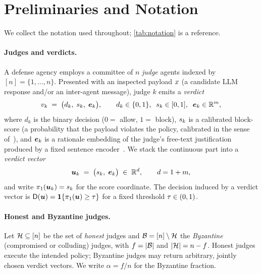 \section{Preliminaries and Notation}
\label{sec:prelim}

We collect the notation used throughout; \cref{tab:notation} is a reference.

\paragraph{Judges and verdicts.}
A defense agency employs a committee of $n$ \emph{judge} agents indexed by
$[n]=\{1,\dots,n\}$. Presented with an inspected payload $x$ (a candidate LLM
response and/or an inter-agent message), judge $k$ emits a \emph{verdict}
\begin{equation}
  v_k \;=\; \bigl(d_k,\; s_k,\; \bm{e}_k\bigr),
  \qquad d_k\in\{0,1\},\;\; s_k\in[0,1],\;\; \bm{e}_k\in\mathbb{R}^{m},
  \label{eq:verdict}
\end{equation}
where $d_k$ is the binary decision ($0=$ allow, $1=$ block), $s_k$ is a
calibrated block-score (a probability that the payload violates the policy, calibrated
in the sense of~\cite{guo2017calibration}), and $\bm{e}_k$ is a rationale embedding of the
judge's free-text justification produced by a fixed sentence
encoder~\cite{reimers2019sentencebert,gao2021simcse}. We stack the continuous part into a
\emph{verdict vector}
\begin{equation}
  \bm{u}_k \;=\; \bigl(s_k,\; \bm{e}_k\bigr)\;\in\;\mathbb{R}^{d},\qquad d = 1+m,
  \label{eq:verdictvec}
\end{equation}
and write $\pi_1(\bm{u}_k)=s_k$ for the score coordinate. The decision induced by a
verdict vector is $\mathsf{D}(\bm{u})=\mathbf{1}\{\pi_1(\bm{u})\ge \tau\}$ for a fixed
threshold $\tau\in(0,1)$.

\paragraph{Honest and Byzantine judges.}
Let $\mathcal{H}\subseteq[n]$ be the set of \emph{honest} judges and
$\mathcal{B}=[n]\setminus\mathcal{H}$ the \emph{Byzantine} (compromised or colluding) judges, with
$f=|\mathcal{B}|$ and $|\mathcal{H}|=n-f$. Honest judges execute the intended policy; Byzantine
judges may return arbitrary, jointly chosen verdict vectors. We write $\alpha=f/n$ for
the Byzantine fraction.

